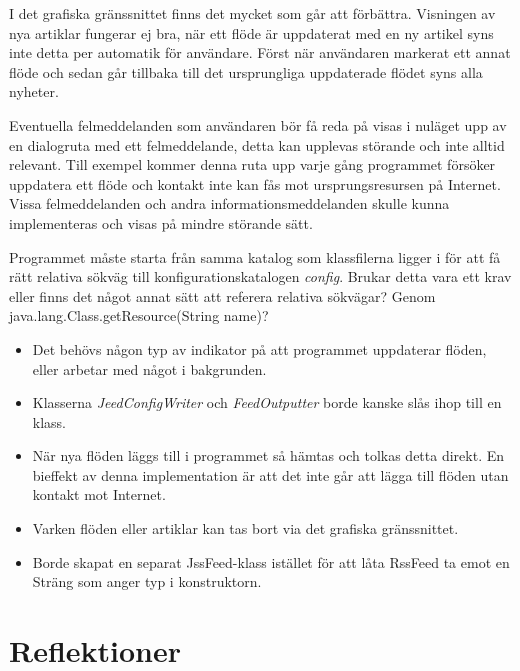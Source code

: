 \documentclass[titlepage, twoside, a4paper, 12pt]{article}
\begin{document}
I det grafiska gränssnittet finns det mycket som går att
förbättra. Visningen av nya artiklar fungerar ej bra, när ett flöde är
uppdaterat med en ny artikel syns inte detta per automatik för
användare. Först när användaren markerat ett annat flöde och sedan går
tillbaka till det ursprungliga uppdaterade flödet syns alla nyheter.


Eventuella felmeddelanden som användaren bör få reda på visas i
nuläget upp av en dialogruta med ett felmeddelande, detta kan upplevas
störande och inte alltid relevant. Till exempel kommer denna ruta upp
varje gång programmet försöker uppdatera ett flöde och kontakt inte
kan fås mot ursprungsresursen på Internet. Vissa felmeddelanden och
andra informationsmeddelanden skulle kunna implementeras och visas på
mindre störande sätt.

Programmet måste starta från samma katalog som klassfilerna ligger i
för att få rätt relativa sökväg till konfigurationskatalogen
\textit{config}. Brukar detta vara ett krav eller finns det något
annat sätt att referera relativa sökvägar? Genom
java.lang.Class.getResource(String name)?

\begin{itemize}
\item Det behövs någon typ av indikator på att programmet uppdaterar flöden,
eller arbetar med något i bakgrunden.

\item Klasserna \textit{JeedConfigWriter} och \textit{FeedOutputter} borde
kanske slås ihop till en klass.

\item När nya flöden läggs till i programmet så hämtas och tolkas detta
direkt. En bieffekt av denna implementation är att det inte går att
lägga till flöden utan kontakt mot Internet.

\item Varken flöden eller artiklar kan tas bort via det grafiska
gränssnittet.

\item Borde skapat en separat JssFeed-klass istället för att låta RssFeed ta
emot en Sträng som anger typ i konstruktorn.
\end{itemize}

\section{Reflektioner}\label{Reflektioner}
\end{document}
